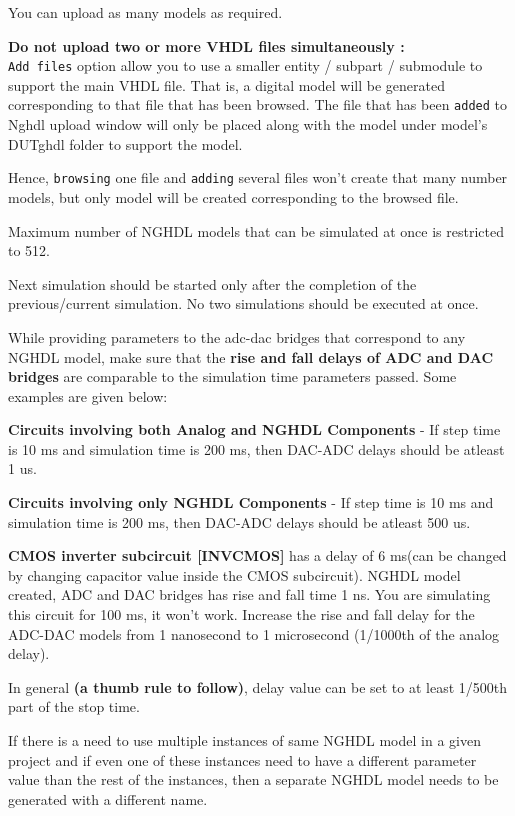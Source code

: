 \begin{compactenum}
\begin{compactenum}
        You can upload as many models as required.
    \end{compactenum}
\item \textbf{Do not upload two or more VHDL files simultaneously :}    \\
\texttt{Add files} option allow you to use a smaller entity / subpart / submodule to support the main VHDL file. That is, a digital model will be generated corresponding to that file that has been browsed. The file that has been \texttt{added} to Nghdl upload window will only be placed along with the model under model’s DUTghdl folder to support the model.

Hence, \texttt{browsing} one file and \texttt{adding} several files won’t create that many number models, but only model will be created corresponding to the browsed file.
\item Maximum number of NGHDL models that can be simulated at once is restricted to 512.
\item Next simulation should be started only after the completion of the previous/current  simulation. No two simulations should be executed at once.
\item While providing parameters to the adc-dac bridges that correspond to any NGHDL model, make sure that the \textbf{rise and fall delays of ADC and DAC bridges} are comparable to the simulation time parameters passed. Some examples are given below: \\
        \begin{compactenum}
        \item \textbf{Circuits involving both Analog and NGHDL Components} - If step time is 10 ms and simulation time is 200 ms, then DAC-ADC delays should be atleast 1 us.
        \item \textbf{Circuits involving only NGHDL Components} - If step time is 10 ms and simulation time is 200 ms, then DAC-ADC delays should be atleast 500 us.
        \item \textbf{CMOS inverter subcircuit [INVCMOS]} has a delay of 6 ms(can be changed by changing capacitor value inside the CMOS subcircuit). 
        NGHDL model created, ADC and DAC bridges has rise and fall time 1 ns. You are simulating this circuit for 100 ms, it won’t work. Increase the rise and fall delay for the ADC-DAC models from 1 nanosecond to 1 microsecond (1/1000th of the analog delay).
        \end{compactenum}
        
        In general \textbf{(a thumb rule to follow)}, delay value can be set to at least 1/500th part of the stop time.
\item If there is a need to use multiple instances of same NGHDL model in a given project and if even one of these instances need to have a different parameter value than the rest of the instances, then a separate NGHDL model needs to be generated with a different name.
\end{compactenum}

